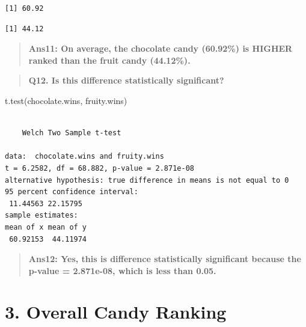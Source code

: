 \documentclass[
  letterpaper,
  DIV=11,
  numbers=noendperiod]{scrartcl}
\newenvironment{Shaded}{\begin{snugshade}}{\end{snugshade}}
\newcommand{\CommentTok}[1]{\textcolor[rgb]{0.37,0.37,0.37}{#1}}
\newcommand{\DecValTok}[1]{\textcolor[rgb]{0.68,0.00,0.00}{#1}}
\newcommand{\FunctionTok}[1]{\textcolor[rgb]{0.28,0.35,0.67}{#1}}
\newcommand{\NormalTok}[1]{\textcolor[rgb]{0.00,0.23,0.31}{#1}}
\newcommand{\OtherTok}[1]{\textcolor[rgb]{0.00,0.23,0.31}{#1}}
\newcommand{\SpecialCharTok}[1]{\textcolor[rgb]{0.37,0.37,0.37}{#1}}
\begin{document}
\begin{verbatim}
[1] 60.92
\end{verbatim}

\begin{Shaded}
\end{Shaded}

\begin{verbatim}
[1] 44.12
\end{verbatim}

\begin{quote}
\textbf{Ans11: On average, the chocolate candy (60.92\%) is HIGHER
ranked than the fruit candy (44.12\%).}
\end{quote}

\begin{quote}
\textbf{Q12. Is this difference statistically significant?}
\end{quote}

\begin{Shaded}
\begin{Highlighting}[]
\FunctionTok{t.test}\NormalTok{(chocolate.wins, fruity.wins)}
\end{Highlighting}
\end{Shaded}

\begin{verbatim}

    Welch Two Sample t-test

data:  chocolate.wins and fruity.wins
t = 6.2582, df = 68.882, p-value = 2.871e-08
alternative hypothesis: true difference in means is not equal to 0
95 percent confidence interval:
 11.44563 22.15795
sample estimates:
mean of x mean of y 
 60.92153  44.11974 
\end{verbatim}

\begin{quote}
\textbf{Ans12: Yes, this is difference statistically significant because
the p-value = 2.871e-08, which is less than 0.05.}
\end{quote}

\hypertarget{overall-candy-ranking}{%
\section{3. Overall Candy Ranking}\label{overall-candy-ranking}}
\end{document}
